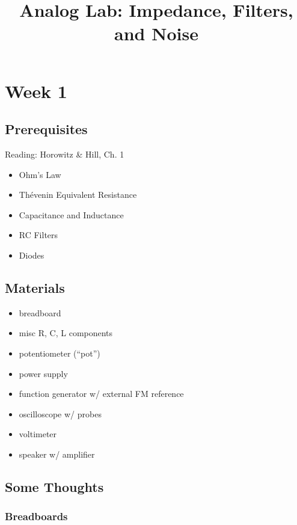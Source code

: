 \documentclass[11pt]{article}
\begin{document}
\title{Analog Lab: Impedance, Filters, and Noise}

\maketitle

\section{Week 1}
\subsection*{Prerequisites}

Reading: Horowitz \& Hill, Ch. 1

\begin{itemize}
\item Ohm's Law
\item Th\'evenin Equivalent Resistance
\item Capacitance and Inductance
\item RC Filters
\item Diodes
\end{itemize}

\subsection*{Materials}

\begin{itemize}
\item breadboard
\item misc R, C, L components
\item potentiometer (``pot'')
\item power supply
\item function generator w/ external FM reference
\item oscilloscope w/ probes
\item voltimeter
\item speaker w/ amplifier
\end{itemize}

\subsection*{Some Thoughts}

\subsubsection*{Breadboards}
\end{document}
